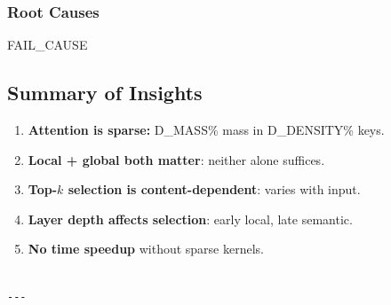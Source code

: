 \subsubsection{Root Causes}

{{FAIL\_CAUSE}}

\subsection{Summary of Insights}

\begin{enumerate}
\item \textbf{Attention is sparse:} {{D\_MASS}}\% mass in {{D\_DENSITY}}\% keys.
\item \textbf{Local + global both matter}: neither alone suffices.
\item \textbf{Top-$k$ selection is content-dependent}: varies with input.
\item \textbf{Layer depth affects selection}: early local, late semantic.
\item \textbf{No time speedup} without sparse kernels.
\end{enumerate}
\begin{lstlisting}

---
\end{lstlisting}